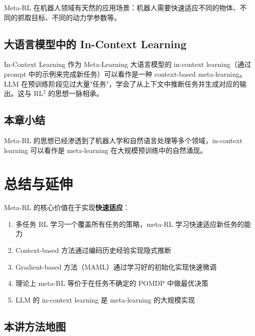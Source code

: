 \documentclass[a4paper]{article}
\begin{document}
Meta-RL 在机器人领域有天然的应用场景：机器人需要快速适应不同的物体、不同的抓取目标、不同的动力学参数等。

\subsection{大语言模型中的 In-Context Learning}

\begin{knowledgebox}{In-Context Learning 作为 Meta-Learning}
大语言模型的 in-context learning（通过 prompt 中的示例来完成新任务）可以看作是一种 context-based meta-learning。LLM 在预训练阶段见过大量"任务"，学会了从上下文中推断任务并生成对应的输出。这与 RL$^2$ 的思想一脉相承。
\end{knowledgebox}

\subsection{本章小结}

Meta-RL 的思想已经渗透到了机器人学和自然语言处理等多个领域，in-context learning 可以看作是 meta-learning 在大规模预训练中的自然涌现。

\section{总结与延伸}

Meta-RL 的核心价值在于实现\textbf{快速适应}：

\begin{enumerate}
    \item 多任务 RL 学习一个覆盖所有任务的策略，meta-RL 学习快速适应新任务的能力
    \item Context-based 方法通过编码历史经验实现隐式推断
    \item Gradient-based 方法（MAML）通过学习好的初始化实现快速微调
    \item 理论上 meta-RL 等价于在任务不确定的 POMDP 中做最优决策
    \item LLM 的 in-context learning 是 meta-learning 的大规模实现
\end{enumerate}

\subsection{本讲方法地图}
\end{document}
